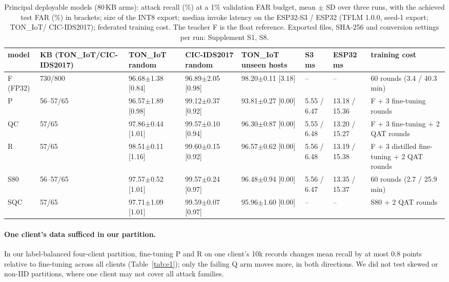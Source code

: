 \documentclass[sigplan,10pt,review,anonymous,nonacm]{acmart}
\newcommand{\cic}{CIC-IDS2017\xspace}
\newcommand{\ton}{TON\_IoT\xspace}
\begin{document}
\begin{table}[t]
\caption{Principal deployable models (80\,KB arms): attack recall (\%) at a 1\% validation FAR budget, mean
$\pm$ SD over three runs, with the achieved test FAR (\%) in brackets; size of the INT8 export; median invoke
latency on the ESP32-S3 / ESP32 (TFLM 1.0.0, seed-1 export; \ton / \cic); federated training cost. The
teacher F is the float reference. Exported files, SHA-256 and conversion settings per run: Supplement S1, S8.}
\label{tab:deploy}
\small\setlength{\tabcolsep}{3pt}
\begin{adjustbox}{max width=\textwidth}
\begin{tabular}{llllllll}
\toprule
model & KB (\ton/\cic) & \ton random & \cic random & \ton unseen hosts & S3 ms & ESP32 ms & training cost \\
\midrule
F (FP32) & 730/800 & 96.68$\pm$1.38 [0.84] & 96.89$\pm$2.05 [0.98] & 98.20$\pm$0.11 [3.18] & -- & -- & 60 rounds (3.4 / 40.3\,min) \\
P & 56--57/65 & 96.57$\pm$1.89 [0.98] & 99.12$\pm$0.37 [0.92] & 93.81$\pm$0.27 [0.00] & 5.55 / 6.47 & 13.18 / 15.36 & F + 3 fine-tuning rounds \\
QC & 57/65 & 97.86$\pm$0.44 [1.01] & 99.57$\pm$0.10 [0.94] & 96.30$\pm$0.87 [0.00] & 5.55 / 6.48 & 13.20 / 15.27 & F + 3 fine-tuning + 2 QAT rounds \\
R & 57/65 & 98.51$\pm$0.11 [1.16] & 99.60$\pm$0.15 [0.92] & 96.57$\pm$0.62 [0.00] & 5.56 / 6.48 & 13.19 / 15.38 & F + 3 distilled fine-tuning + 2 QAT rounds \\
S80 & 56--57/65 & 97.57$\pm$0.52 [1.01] & 99.57$\pm$0.24 [0.97] & 96.48$\pm$0.94 [0.00] & 5.56 / 6.47 & 13.35 / 15.37 & 60 rounds (2.7 / 25.9\,min) \\
SQC & 57/65 & 97.71$\pm$1.09 [1.01] & 99.59$\pm$0.07 [0.97] & 95.96$\pm$1.60 [0.00] & -- & -- & S80 + 2 QAT rounds \\
\bottomrule
\end{tabular}
\end{adjustbox}
\end{table}

\paragraph{One client's data sufficed in our partition.} In our label-balanced four-client partition,
fine-tuning P and R on one client's 10k records changes mean recall by at most 0.8 points relative to
fine-tuning across all clients (Table~\ref{tab:e1}); only the failing Q arm moves more, in both
directions. We did not test skewed or non-IID partitions, where one client may not cover all attack
families.
\end{document}
